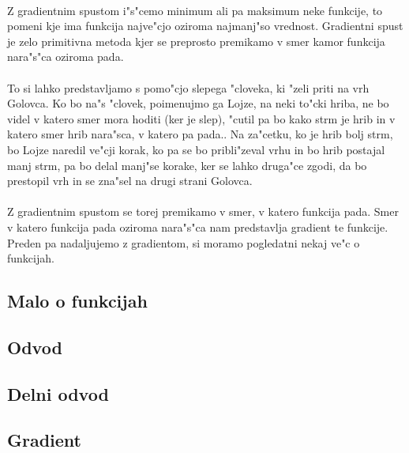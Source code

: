 \paragraph{}
Z gradientnim spustom i"s"cemo minimum ali pa maksimum neke funkcije, to pomeni kje ima funkcija najve"cjo oziroma najmanj"so vrednost. Gradientni spust je zelo primitivna metoda kjer se preprosto premikamo v smer kamor funkcija nara"s"ca oziroma pada.

\paragraph{}
To si lahko predstavljamo s pomo"cjo slepega "cloveka, ki "zeli priti na vrh Golovca. Ko bo na"s "clovek, poimenujmo ga Lojze, na neki to"cki hriba, ne bo videl v katero smer mora hoditi (ker je slep), "cutil pa bo kako strm je hrib in v katero smer hrib nara"sca, v katero pa pada.. Na za"cetku, ko je hrib bolj strm, bo Lojze naredil ve"cji korak, ko pa se bo pribli"zeval vrhu in bo hrib postajal manj strm, pa bo delal manj"se korake, ker se lahko druga"ce zgodi, da bo prestopil vrh in se zna"sel na drugi strani Golovca.

\paragraph{}
Z gradientnim spustom se torej premikamo v smer, v katero funkcija pada. Smer v katero funkcija pada oziroma nara"s"ca nam predstavlja gradient te funkcije. Preden pa nadaljujemo z gradientom, si moramo pogledatni nekaj ve"c o funkcijah.

\subsection*{Malo o funkcijah}


\subsection*{Odvod}


\subsection*{Delni odvod}


\subsection*{Gradient}


